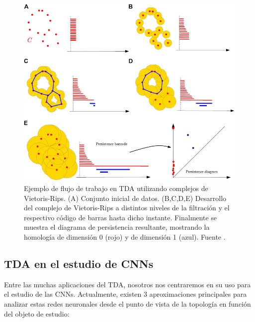 \begin{figure}[H]
	\centering
	\includegraphics[width=130mm]{img/persistent-homology.jpg}
	\caption{Ejemplo de flujo de trabajo en TDA utilizando complejos de Vietoris-Rips. (A) Conjunto inicial de datos. (B,C,D,E) Desarrollo del complejo de Vietoris-Rips a distintos niveles de la filtración y el respectivo código de barras hasta dicho instante. Finalmente se muestra el diagrama de persistencia resultante, mostrando la homología de dimensión 0 (rojo) y de dimensión 1 (azul). Fuente \cite{chazal2021introduction}.}
\end{figure}

\subsection{TDA en el estudio de CNNs}

Entre las muchas aplicaciones del TDA, nosotros nos centraremos en su uso para el estudio de las CNNs. Actualmente, existen 3 aproximaciones principales para analizar estas redes neuronales desde el punto de vista de la topología en función del objeto de estudio:

